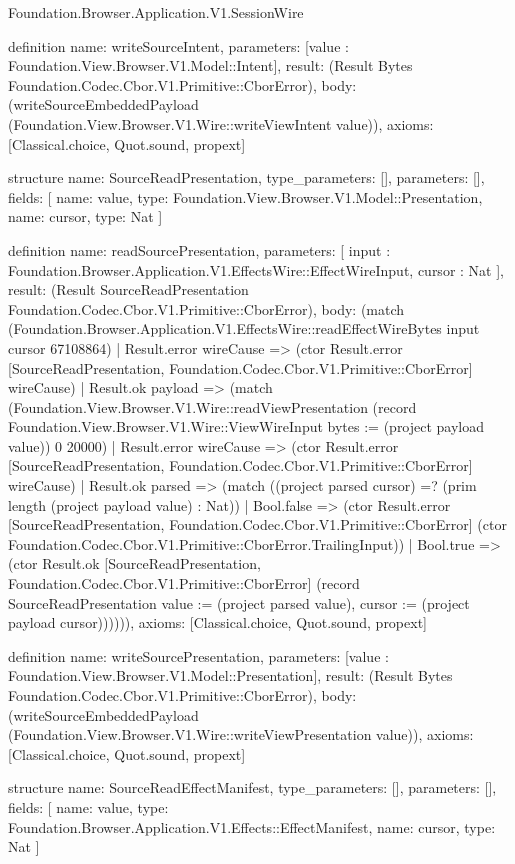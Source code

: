 \begin{lexlean}{Foundation.Browser.Application.V1.SessionWire}
\begin{semanticmodule}
definition{
  name: writeSourceIntent,
  parameters: [value : Foundation.View.Browser.V1.Model::Intent],
  result: (Result Bytes Foundation.Codec.Cbor.V1.Primitive::CborError),
  body: (writeSourceEmbeddedPayload (Foundation.View.Browser.V1.Wire::writeViewIntent value)),
  axioms: [Classical.choice, Quot.sound, propext]
}

structure{
  name: SourceReadPresentation,
  type_parameters: [],
  parameters: [],
  fields: [
    {name: value, type: Foundation.View.Browser.V1.Model::Presentation},
    {name: cursor, type: Nat}
  ]
}

definition{
  name: readSourcePresentation,
  parameters: [
    input : Foundation.Browser.Application.V1.EffectsWire::EffectWireInput,
    cursor : Nat
  ],
  result: (Result SourceReadPresentation Foundation.Codec.Cbor.V1.Primitive::CborError),
  body: (match (Foundation.Browser.Application.V1.EffectsWire::readEffectWireBytes input cursor 67108864)
    | Result.error wireCause => (ctor Result.error [SourceReadPresentation, Foundation.Codec.Cbor.V1.Primitive::CborError] wireCause)
    | Result.ok payload => (match (Foundation.View.Browser.V1.Wire::readViewPresentation (record Foundation.View.Browser.V1.Wire::ViewWireInput {bytes := (project payload value)}) 0 20000)
      | Result.error wireCause => (ctor Result.error [SourceReadPresentation, Foundation.Codec.Cbor.V1.Primitive::CborError] wireCause)
      | Result.ok parsed => (match ((project parsed cursor) =? (prim length (project payload value) : Nat))
        | Bool.false => (ctor Result.error [SourceReadPresentation, Foundation.Codec.Cbor.V1.Primitive::CborError] (ctor Foundation.Codec.Cbor.V1.Primitive::CborError.TrailingInput))
        | Bool.true => (ctor Result.ok [SourceReadPresentation, Foundation.Codec.Cbor.V1.Primitive::CborError] (record SourceReadPresentation {value := (project parsed value), cursor := (project payload cursor)}))))),
  axioms: [Classical.choice, Quot.sound, propext]
}

definition{
  name: writeSourcePresentation,
  parameters: [value : Foundation.View.Browser.V1.Model::Presentation],
  result: (Result Bytes Foundation.Codec.Cbor.V1.Primitive::CborError),
  body: (writeSourceEmbeddedPayload (Foundation.View.Browser.V1.Wire::writeViewPresentation value)),
  axioms: [Classical.choice, Quot.sound, propext]
}

structure{
  name: SourceReadEffectManifest,
  type_parameters: [],
  parameters: [],
  fields: [
    {name: value, type: Foundation.Browser.Application.V1.Effects::EffectManifest},
    {name: cursor, type: Nat}
  ]
}


\end{semanticmodule}
\end{lexlean}
